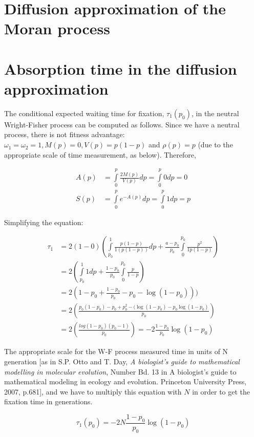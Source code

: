 \setcounter{chapter}{5}
\setcounter{section}{0}
\section{Diffusion approximation of the Moran process}

\setcounter{chapter}{6}
\setcounter{section}{0}
\section{Absorption time in the diffusion approximation}
The conditional expected waiting time for fixation, $\tau_1(p_0)$, in the neutral Wright-Fisher process can be computed as follows. Since we have a neutral process, there is not fitness advantage: $\omega_1 = \omega_2 = 1, M(p)=0, V(p) = p(1-p)$ and $\rho(p) = p$ (due to the appropriate scale of time measurement, as below).
Therefore,

\begin{align*}
A(p) &= \int\limits_{0}^{p} \frac{2M(p)}{V(p)} dp = \int\limits_{0}^{p} 0dp = 0 \\
S(p) &= \int\limits_{0}^{p} e^{-A(p)}dp = \int\limits_{0}^{p} 1dp = p
\end{align*}

Simplifying the equation:

\begin{align*}
\tau_1 &= 2(1-0) \left( \int\limits_{p_0}^{1} \frac{p(1-p)}{1(p(1-p))}dp +\frac{a-p_0}{p_0} \int\limits_{0}^{p_0} \frac{p^2}{1p(1-p)} \right)\\
&= 2 \left( \int\limits_{p_0}^{1}  1dp + \frac{1-p_0}{p_0} \int\limits_{0}^{p_0} \frac{p}{1-p}\right) \\
&= 2(1-p_0 + \frac{1-p_0}{p_0}-p_0-\log(1-p_0)))\\
&= 2(\frac{p_0(1-p_0)-p_0+p^2_0 - (\log(1-p_0) -p_0 \log(1-p_0)}{p_0})\\
&= 2(\frac{log(1-p_0)(p_0-1)}{p_0}) = -2\frac{1-p_0}{p_0} \log(1-p_0)
\end{align*}

The appropriate scale for the W-F process measured time in units of N generation [as in S.P. Otto and T. Day, \textit{A biologist's guide to mathematical modelling in molecular evolution}, Number Bd. 13 in A biologist’s guide to mathematical modeling in ecology and evolution. Princeton University Press, 2007, p.681], and we have to multiply this equation with $N$ in order to get the fixation time in generations.

\[ \tau_1(p_0) = -2N\frac{1-p_0}{p_0}\log(1-p_0) \]

